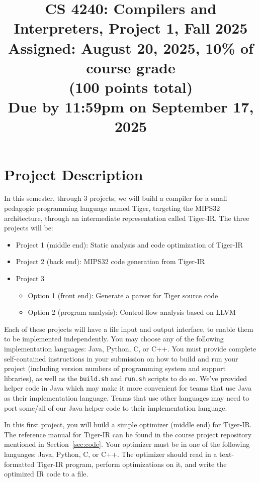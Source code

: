 \documentclass[12pt]{article}
\title{CS 4240: Compilers and Interpreters, Project 1, Fall 2025\\
\Large
Assigned: August 20, 2025, 10\% of course grade\\
(100 points total)\\
Due by 11:59pm on September 17, 2025
}
\author{}
\date{}
\begin{document}
\maketitle
\thispagestyle{fancy}

\section{Project Description}

In this semester, through 3 projects, we will build a compiler for a
small pedagogic programming language named Tiger,
targeting the MIPS32 architecture,
through an intermediate representation called Tiger-IR.
The three projects will be:
\begin{itemize}
\item Project 1 (middle end): Static analysis and code optimization of Tiger-IR
\item Project 2 (back end): MIPS32 code generation from Tiger-IR
\item Project 3
\begin{itemize}
  \item Option 1 (front end): Generate a parser for Tiger source code
\item Option 2 (program analysis): Control-flow analysis based on LLVM
  \end{itemize}
\end{itemize}
Each of these projects will have a file input and output interface, to
enable them to be implemented independently.  You may choose any
of the following implementation languages: Java, Python, C, or C++. You must provide complete
self-contained instructions in your submission on how to build and run
your project (including version numbers of programming system and
support libraries), as well as the \texttt{build.sh} and \texttt{run.sh} scripts to do so.  We've provided helper code in Java which may make
it more convenient for teams that use Java as their implementation
language.  Teams that use other languages may need to port some/all of
our Java helper code to their implementation language.

In this first project, you will build a simple optimizer (middle end) for Tiger-IR. 
The reference manual for Tiger-IR can be found in the course project repository
mentioned in Section~\ref{sec:code}.
Your optimizer must be in one of the following languages: Java, Python, C, or C++. The optimizer should read in a text-formatted Tiger-IR program, perform optimizations on it,
and write the optimized IR code to a file.
\end{document}
